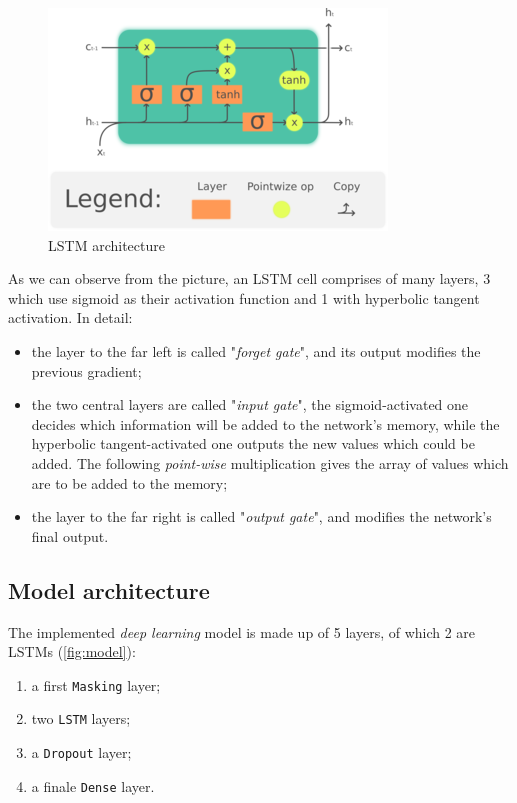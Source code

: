 \documentclass[8pt,notitlepage]{report}
\begin{document}
		\begin{figure}[H]
			\begin{center}
				\includegraphics[scale=2.2]{lstm}
				\caption{LSTM architecture}
			\end{center}
		\end{figure}		
		
		As we can observe from the picture, an LSTM cell comprises of many layers, 3 which use sigmoid as their activation function and 1 with hyperbolic tangent activation.
		In detail:
		\begin{itemize}
			\item the layer to the far left is called "\textit{forget gate}", and its output modifies the previous gradient;
			\item the two central layers are called "\textit{input gate}", the sigmoid-activated one decides which information will be added to the network's memory, while the hyperbolic tangent-activated one outputs the new values which could be added. The following \textit{point-wise} multiplication gives the array of values which are to be added to the memory;
			\item the layer to the far right is called "\textit{output gate}", and modifies the network's final output.
		\end{itemize}
		
		\subsection{Model architecture}
			The implemented \textit{deep learning} model is made up of 5 layers, of which 2 are LSTMs (\cref{fig:model}):
			\begin{enumerate}
				\item a first \verb|Masking| layer;
				\item two \verb|LSTM| layers;
				\item a \verb|Dropout| layer;
				\item a finale \verb|Dense| layer.
			\end{enumerate}
			
\end{document}
